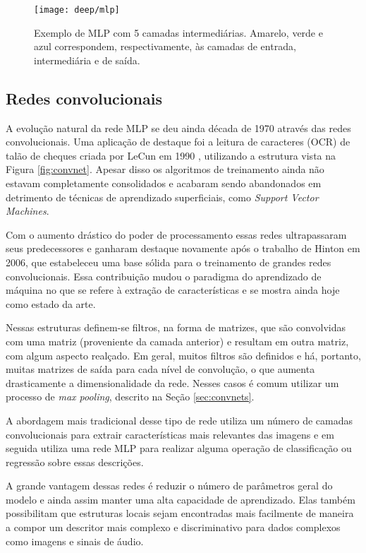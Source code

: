 \begin{figure}
\centering
\texttt{[image: deep/mlp]}
\caption{Exemplo de MLP com 5 camadas intermediárias. Amarelo, verde e azul correspondem, respectivamente, às camadas de entrada, intermediária e de saída.}
\label{fig:mlp}
\end{figure}

\subsection{Redes convolucionais}
A evolução natural da rede MLP se deu ainda década de 1970 através das redes convolucionais. Uma aplicação de destaque foi a leitura de caracteres (OCR) de talão de cheques criada por LeCun em 1990 \cite{lecunhandwritten}, utilizando a estrutura vista na Figura \ref{fig:convnet}. Apesar disso os algoritmos de treinamento ainda não estavam completamente consolidados e acabaram sendo abandonados em detrimento de técnicas de aprendizado superficiais, como \textit{Support Vector Machines}.

Com o aumento drástico do poder de processamento essas redes ultrapassaram seus predecessores e ganharam destaque novamente após o trabalho de Hinton \cite{hintonCONVNET} em 2006, que estabeleceu uma base sólida para o treinamento de grandes redes convolucionais. Essa contribuição mudou o paradigma do aprendizado de máquina no que se refere à extração de características e se mostra ainda hoje como estado da arte. 

Nessas estruturas definem-se filtros, na forma de matrizes, que são convolvidas com uma matriz (proveniente da camada anterior) e resultam em outra matriz, com algum aspecto realçado. Em geral, muitos filtros são definidos e há, portanto, muitas matrizes de saída para cada nível de convolução, o que aumenta drasticamente a dimensionalidade da rede. Nesses casos é comum utilizar um processo de \textit{max pooling}, descrito na Seção \ref{sec:convnets}.

A abordagem mais tradicional desse tipo de rede utiliza um número de camadas convolucionais para extrair características mais relevantes das imagens e em seguida utiliza uma rede MLP para realizar alguma operação de classificação ou regressão sobre essas descrições.

A grande vantagem dessas redes é reduzir o número de parâmetros geral do modelo e ainda assim manter uma alta capacidade de aprendizado. Elas também possibilitam que estruturas locais sejam encontradas mais facilmente de maneira a compor um descritor mais complexo e discriminativo para dados complexos como imagens e sinais de áudio.

